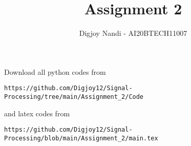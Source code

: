 \documentclass[journal,12pt,twocolumn]{IEEEtran}
\DeclareMathOperator*{\Res}{Res}
\begin{document}
\newcommand{\BEQA}{\begin{eqnarray}}
\newcommand{\EEQA}{\end{eqnarray}}
\newcommand{\define}{\stackrel{\triangle}{=}}

\raggedbottom
\setlength{\parindent}{0pt}
\providecommand{\mbf}{\mathbf}
\providecommand{\pr}[1]{\ensuremath{\Pr\left(#1\right)}}
\providecommand{\qfunc}[1]{\ensuremath{Q\left(#1\right)}}
\providecommand{\sbrak}[1]{\ensuremath{{}\left[#1\right]}}
\providecommand{\lsbrak}[1]{\ensuremath{{}\left[#1\right.}}
\providecommand{\rsbrak}[1]{\ensuremath{{}\left.#1\right]}}
\providecommand{\brak}[1]{\ensuremath{\left(#1\right)}}
\providecommand{\lbrak}[1]{\ensuremath{\left(#1\right.}}
\providecommand{\rbrak}[1]{\ensuremath{\left.#1\right)}}
\providecommand{\cbrak}[1]{\ensuremath{\left\{#1\right\}}}
\providecommand{\lcbrak}[1]{\ensuremath{\left\{#1\right.}}
\providecommand{\rcbrak}[1]{\ensuremath{\left.#1\right\}}}
\theoremstyle{remark}
\newtheorem{rem}{Remark}
\newcommand{\sgn}{\mathop{\mathrm{sgn}}}
\providecommand{\abs}[1]{\vert#1\vert}
\providecommand{\res}[1]{\Res\displaylimits_{#1}} 
\providecommand{\norm}[1]{\lVert#1\rVert}
\providecommand{\mtx}[1]{\mathbf{#1}}
\providecommand{\mean}[1]{E[ #1 ]}
\providecommand{\fourier}{\overset{\mathcal{F}}{ \rightleftharpoons}}
\providecommand{\system}{\overset{\mathcal{H}}{ \longleftrightarrow}}
\newcommand{\solution}{\noindent \textbf{Solution: }}
\newcommand{\cosec}{\,\text{cosec}\,}
\providecommand{\dec}[2]{\ensuremath{\overset{#1}{\underset{#2}{\gtrless}}}}
\newcommand{\myvec}[1]{\ensuremath{\begin{pmatrix}#1\end{pmatrix}}}
\newcommand{\mydet}[1]{\ensuremath{\begin{vmatrix}#1\end{vmatrix}}}
\makeatletter
{}
\makeatother
\let\StandardTheFigure\thefigure
\let\vec\mathbf
\renewcommand{\thefigure}{\theproblem}
\def\putbox#1#2#3{\makebox[0in][l]{\makebox[#1][l]{}\raisebox{\baselineskip}[0in][0in]{\raisebox{#2}[0in][0in]{#3}}}}
     \def\rightbox#1{\makebox[0in][r]{#1}}
     \def\centbox#1{\makebox[0in]{#1}}
     \def\topbox#1{\raisebox{-\baselineskip}[0in][0in]{#1}}
     \def\midbox#1{\raisebox{-0.5\baselineskip}[0in][0in]{#1}}
\vspace{3cm}
\title{Assignment 2}
\author{Digjoy Nandi - AI20BTECH11007}
\maketitle
\newpage
\bigskip
\renewcommand{\thefigure}{\theenumi}
\renewcommand{\thetable}{\theenumi}
Download all python codes from 
\begin{lstlisting}
https://github.com/Digjoy12/Signal-Processing/tree/main/Assignment_2/Code
\end{lstlisting}
%
and latex codes from 
%
\begin{lstlisting}
https://github.com/Digjoy12/Signal-Processing/blob/main/Assignment_2/main.tex
\end{lstlisting}
\end{document}
